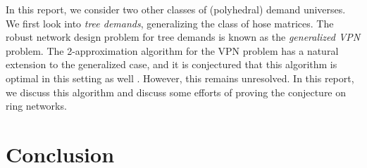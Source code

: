 \documentclass[11pt]{article}
\theoremstyle{definition}
\begin{document}
    In this report, we consider two other classes of (polyhedral) demand universes.
    We first look into \emph{tree demands}, generalizing the class of hose matrices.
    The robust network design problem for tree demands is known as the \emph{generalized VPN} problem.
    The 2-approximation algorithm for the VPN problem has a natural extension to the generalized case, and it is conjectured that this algorithm is optimal in this setting as well \cite{}.
    However, this remains unresolved.
    In this report, we discuss this algorithm and discuss some efforts of proving the conjecture on ring networks.



    

    

    \section{Conclusion}
\end{document}
